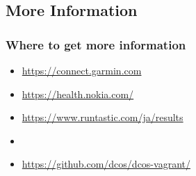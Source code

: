 \documentclass[aspectratio=169,11pt,hyperref={colorlinks=true}]{beamer}
\begin{document}
\subsection{More Information}
\begin{frame}
\frametitle{Where to get more information}
  \begin{itemize}
    \item \url{https://connect.garmin.com}
    \item \url{https://health.nokia.com/}
    \item \url{https://www.runtastic.com/ja/results}
    \item \url{}
    \item \url{https://github.com/dcos/dcos-vagrant/}
  \end{itemize}
\end{frame}
\end{document}
